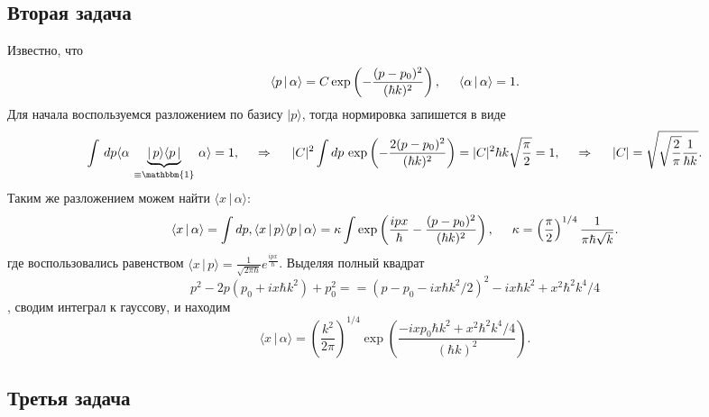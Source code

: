 \subsection*{Вторая задача}

Известно, что
\begin{equation*}
    \langle p \,|\, \alpha \rangle = C \exp\left(
        -\frac{(p-p_0)^2}{(\hbar k)^2}
    \right), \hspace{5 mm} \langle \alpha \,|\, \alpha \rangle =1.
\end{equation*}
Для начала воспользуемся разложением по базису $| p\rangle $, тогда нормировка запишется в виде
\begin{equation*}
    \int \d p \langle \alpha \, \underbrace{|\, p \rangle  \langle p \,|}_{\equiv \mathbbm{1}}   \, \alpha \rangle = 1,
    \hspace{0.5cm} \Rightarrow \hspace{0.5cm}  
    |C|^2 \int d p\, 
    \exp\left(
        -\frac{2(p-p_0)^2}{(\hbar k)^2}
    \right) = |C|^2 \hbar k \sqrt{\frac{\pi}{2}} = 1,
    \hspace{0.5cm} \Rightarrow \hspace{0.5cm}
    |C| = \sqrt{\sqrt{\frac{2}{\pi}} \frac{1}{\hbar k}}.
\end{equation*}
Таким же разложением можем найти $\langle x \,|\, \alpha \rangle $:
\begin{equation*}
    \langle x \,|\, \alpha \rangle = \int dp, \langle x \,|\, p \rangle \langle p \,|\, \alpha \rangle =
    \kappa \int \exp\left(\frac{i p x}{\hbar} - \frac{(p-p_0)^2}{(\hbar k)^2}\right), 
    \hspace{5 mm} 
    \kappa = \left(\frac{\pi}{2}\right)^{1/4} \frac{1}{\pi \hbar \sqrt{k}}.
\end{equation*}
где воспользовались равенством $\langle x \,|\, p \rangle = \frac{1}{\sqrt{2 \pi \hbar}} e^{\frac{i p x}{\hbar}}$. Выделяя полный квадрат
\begin{equation*}
     p^2 - 2 p (p_0 + i x \hbar k^2) + p_0^2 = 
        = (p-p_0 - ix \hbar k^2/2)^2 -  i x \hbar k^2 + x^2 \hbar^2 k^4/4
\end{equation*}
, сводим интеграл к гауссову, и находим
\begin{equation*}
    \langle x \,|\, \alpha \rangle 
    =
    \left(\frac{k^2}{2\pi}\right)^{1/4} \exp\left(
        \frac{-  i x p_0 \hbar k^2 + x^2 \hbar^2 k^4/4}{(\hbar k)^2}
    \right).
\end{equation*}

\subsection*{Третья задача}


